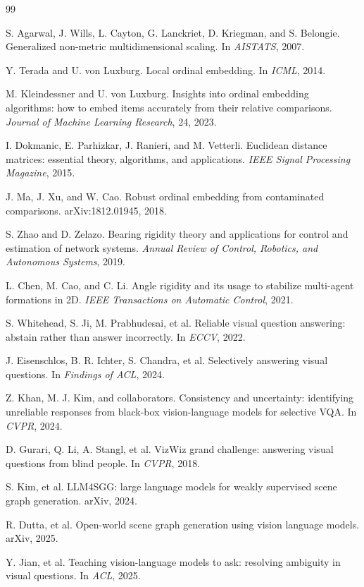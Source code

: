\documentclass[11pt,a4paper]{ctexart}
\begin{document}
\begin{thebibliography}{99}

S. Agarwal, J. Wills, L. Cayton, G. Lanckriet, D. Kriegman, and S. Belongie.
\newblock Generalized non-metric multidimensional scaling.
\newblock In \emph{AISTATS}, 2007.

Y. Terada and U. von Luxburg.
\newblock Local ordinal embedding.
\newblock In \emph{ICML}, 2014.

M. Kleindessner and U. von Luxburg.
\newblock Insights into ordinal embedding algorithms: how to embed items accurately from their relative comparisons.
\newblock \emph{Journal of Machine Learning Research}, 24, 2023.

I. Dokmanic, E. Parhizkar, J. Ranieri, and M. Vetterli.
\newblock Euclidean distance matrices: essential theory, algorithms, and applications.
\newblock \emph{IEEE Signal Processing Magazine}, 2015.

J. Ma, J. Xu, and W. Cao.
\newblock Robust ordinal embedding from contaminated comparisons.
\newblock arXiv:1812.01945, 2018.

S. Zhao and D. Zelazo.
\newblock Bearing rigidity theory and applications for control and estimation of network systems.
\newblock \emph{Annual Review of Control, Robotics, and Autonomous Systems}, 2019.

L. Chen, M. Cao, and C. Li.
\newblock Angle rigidity and its usage to stabilize multi-agent formations in 2D.
\newblock \emph{IEEE Transactions on Automatic Control}, 2021.

S. Whitehead, S. Ji, M. Prabhudesai, et al.
\newblock Reliable visual question answering: abstain rather than answer incorrectly.
\newblock In \emph{ECCV}, 2022.

J. Eisenschlos, B. R. Ichter, S. Chandra, et al.
\newblock Selectively answering visual questions.
\newblock In \emph{Findings of ACL}, 2024.

Z. Khan, M. J. Kim, and collaborators.
\newblock Consistency and uncertainty: identifying unreliable responses from black-box vision-language models for selective VQA.
\newblock In \emph{CVPR}, 2024.

D. Gurari, Q. Li, A. Stangl, et al.
\newblock VizWiz grand challenge: answering visual questions from blind people.
\newblock In \emph{CVPR}, 2018.

S. Kim, et al.
\newblock LLM4SGG: large language models for weakly supervised scene graph generation.
\newblock arXiv, 2024.

R. Dutta, et al.
\newblock Open-world scene graph generation using vision language models.
\newblock arXiv, 2025.

Y. Jian, et al.
\newblock Teaching vision-language models to ask: resolving ambiguity in visual questions.
\newblock In \emph{ACL}, 2025.

\end{thebibliography}
\end{document}
